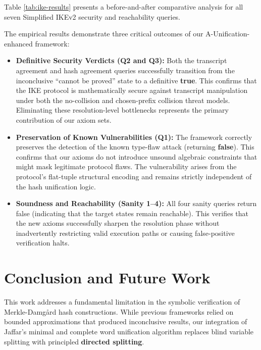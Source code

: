 \documentclass[journal]{IEEEtran}
\begin{document}
Table \ref{tab:ike-results} presents a before-and-after comparative analysis for all seven Simplified IKEv2 security and reachability queries.


The empirical results demonstrate three critical outcomes of our A-Unification-enhanced framework:

\begin{itemize}
    \item \textbf{Definitive Security Verdicts (Q2 and Q3):} Both the transcript agreement and hash agreement queries successfully transition from the inconclusive ``cannot be proved'' state to a definitive \textbf{true}. This confirms that the IKE protocol is mathematically secure against transcript manipulation under both the no-collision and chosen-prefix collision threat models. Eliminating these resolution-level bottlenecks represents the primary contribution of our axiom sets.

    \item \textbf{Preservation of Known Vulnerabilities (Q1):} The framework correctly preserves the detection of the known type-flaw attack (returning \textbf{false}). This confirms that our axioms do not introduce unsound algebraic constraints that might mask legitimate protocol flaws. The vulnerability arises from the protocol's flat-tuple structural encoding and remains strictly independent of the hash unification logic.

    \item \textbf{Soundness and Reachability (Sanity 1--4):} All four sanity queries return false (indicating that the target states remain reachable). This verifies that the new axioms successfully sharpen the resolution phase without inadvertently restricting valid execution paths or causing false-positive verification halts.
\end{itemize}


\section{Conclusion and Future Work}

This work addresses a fundamental limitation in the symbolic verification of Merkle-Damg\aa{}rd hash constructions. While previous frameworks relied on bounded approximations that produced inconclusive results, our integration of Jaffar's minimal and complete word unification algorithm \cite{jaffar1990word} replaces blind variable splitting with principled \textbf{directed splitting}. 
\end{document}
